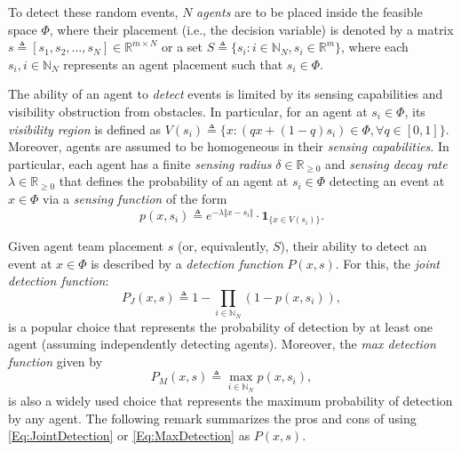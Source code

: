 \documentclass[letterpaper, 10 pt, conference]{ieeeconf}
\newcommand{\R}{\mathbb{R}}
\newcommand{\N}{\mathbb{N}}
\begin{document}
To detect these random events, $N$ \emph{agents} are to be placed inside the feasible space $\Phi$, where their placement (i.e., the decision variable) is denoted by a matrix $s \triangleq [s_1, s_2, \ldots, s_N]\in\R^{m\times N}$ or a set $S\triangleq \{s_i:i\in\N_N, s_i\in\R^m\}$, where each $s_i, i\in\N_N$ represents an agent placement such that $s_i \in \Phi$. 



The ability of an agent to \emph{detect} events is limited by its sensing capabilities and visibility obstruction from obstacles. In particular, for an agent at $s_i \in \Phi$, its \emph{visibility region} is defined as 
$
V(s_i) \triangleq \{x: (qx+(1-q)s_i)\in \Phi, \forall q \in [0,1] \}.
$ 
Moreover, agents are assumed to be homogeneous in their \emph{sensing capabilities}. In particular, each agent has a finite \emph{sensing radius} $\delta \in \R_{\geq 0}$ and \emph{sensing decay rate} $\lambda\in\R_{\geq 0}$ that defines the probability of an agent at $s_i\in \Phi$ detecting an event at $x\in \Phi$ via a \emph{sensing function} of the form 
\begin{equation}
\label{Eq:SensingFunction}
p(x,s_i)\triangleq e^{-\lambda \Vert x - s_i\Vert}\cdot\mathbf{1}_{\{x\in V(s_i)\}}.
\end{equation}




Given agent team placement $s$ (or, equivalently, $S$), their ability to detect an event at $x \in \Phi$ is described by a \emph{detection function} $P(x,s)$. For this, the \emph{joint detection function}: 
\begin{equation}\label{Eq:JointDetection}
P_J(x,s) \triangleq 1-\prod_{i\in\N_N}(1-p(x,s_i)),
\end{equation}
is a popular choice that represents the probability of detection by at least one agent (assuming independently detecting agents). Moreover, the \emph{max detection function} given by 
\begin{equation}\label{Eq:MaxDetection}
P_M(x,s) \triangleq \max_{i\in\N_N} p(x,s_i),
\end{equation}
is also a widely used choice that represents the maximum probability of detection by any agent. The following remark summarizes the pros and cons of using \eqref{Eq:JointDetection} or \eqref{Eq:MaxDetection} as $P(x,s)$.  
\end{document}
